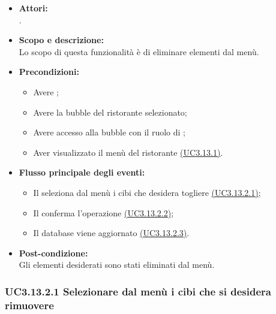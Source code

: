\begin{itemize}
	\item \textbf{Attori:}
	\\.
	\item \textbf{Scopo e descrizione:} 
	\\Lo scopo di questa funzionalità è di eliminare elementi dal menù.
	\item \textbf{Precondizioni:}
	\begin{itemize}
		\item Avere ;
		\item Avere la bubble del ristorante selezionato;
		\item Avere accesso alla bubble con il ruolo di ;
		\item Aver visualizzato il menù del ristorante \hyperref[UC3.13.1]{(UC3.13.1)}.
	\end{itemize}
	\item \textbf{Flusso principale degli eventi:}
	\begin{itemize}
		\item Il  seleziona dal menù i cibi che desidera togliere \hyperref[UC3.13.2.1]{(UC3.13.2.1)};
		\item Il  conferma l'operazione \hyperref[UC3.13.2.2]{(UC3.13.2.2)};
		\item Il database viene aggiornato \hyperref[UC3.13.2.3]{(UC3.13.2.3)}.
	\end{itemize}
	\item \textbf{Post-condizione:}
	\\Gli elementi desiderati sono stati eliminati dal menù.
\end{itemize}

\subsubsection{UC3.13.2.1 Selezionare dal menù i cibi che si desidera rimuovere} \label{UC3.13.2.1}

